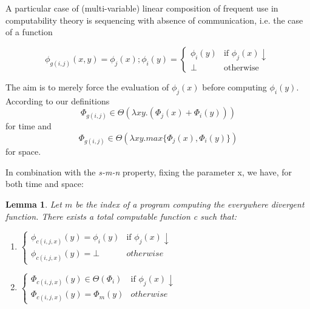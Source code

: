 \documentclass[10pt, a4paper, oneside, titlepage, draft]{article}
\newtheorem{lemma}[shrd]{Lemma}
\begin{document}
A particular case of (multi-variable) linear composition of frequent use in computability theory is sequencing with absence of communication, i.e. the case of a function

\begin{equation*}
    \phi_{g(i,j)}(x,y) = \phi_j(x);\phi_i(y) = 
    \begin{cases}
        \phi_i(y)   & \text{if } \phi_j(x)\downarrow    \\
        \bot        & \text{otherwise}
    \end{cases}
\end{equation*}

\noindent The aim is to merely force the evaluation of $\phi_j(x)$ before computing $\phi_i(y)$. According to our definitions
\begin{equation*}
    \Phi_{g(i,j)} \in \Theta ( \lambda xy . ( \Phi_j(x) + \Phi_i(y) ) )
\end{equation*}
for time and
\begin{equation*}
    \Phi_{g(i,j)} \in \Theta ( \lambda xy . max \{ \Phi_j(x) , \Phi_i(y) \} )
\end{equation*}
for space.

In combination with the \emph{s-m-n} property, fixing the parameter x, we have, for both time and space:

\begin{lemma}
    Let $m$ be the index of a program computing the everywhere divergent function. There exists a total computable function c such that:
    \begin{enumerate}[label=(\alph*)]
        \item $
            \begin{cases}
                \phi_{c(i,j,x)}(y) = \phi_i(y)  & \text{if  } \phi_j(x)\downarrow \\
                \phi_{c(i,j,x)}(y) = \bot       & otherwise
            \end{cases}
        $

        \item $
            \begin{cases}
                \Phi_{c(i,j,x)}(y) \in \Theta ( \Phi_i )  & \text{if  } \phi_j(x)\downarrow \\
                \Phi_{c(i,j,x)}(y) = \Phi_m(y)       & otherwise
            \end{cases}
        $
    \end{enumerate}
\end{lemma}
\end{document}
